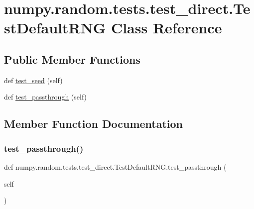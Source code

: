 \hypertarget{classnumpy_1_1random_1_1tests_1_1test__direct_1_1TestDefaultRNG}{}\section{numpy.\+random.\+tests.\+test\+\_\+direct.\+Test\+Default\+R\+NG Class Reference}
\label{classnumpy_1_1random_1_1tests_1_1test__direct_1_1TestDefaultRNG}
\subsection*{Public Member Functions}
\begin{DoxyCompactItemize}
\item 
def \hyperlink{classnumpy_1_1random_1_1tests_1_1test__direct_1_1TestDefaultRNG_a10ed9f8dded4ff7c04625fd748ce0f61}{test\+\_\+seed} (self)
\item 
def \hyperlink{classnumpy_1_1random_1_1tests_1_1test__direct_1_1TestDefaultRNG_adb9ee27cd778cfaeb5d7caae9d5eca78}{test\+\_\+passthrough} (self)
\end{DoxyCompactItemize}


\subsection{Member Function Documentation}
\mbox{\label{classnumpy_1_1random_1_1tests_1_1test__direct_1_1TestDefaultRNG_adb9ee27cd778cfaeb5d7caae9d5eca78}} 
\subsubsection{\texorpdfstring{test\+\_\+passthrough()}{test\_passthrough()}}
{\footnotesize\ttfamily def numpy.\+random.\+tests.\+test\+\_\+direct.\+Test\+Default\+R\+N\+G.\+test\+\_\+passthrough (\begin{DoxyParamCaption}\item[{}]{self }\end{DoxyParamCaption})}

